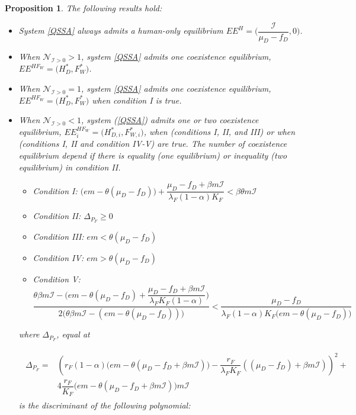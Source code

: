 \documentclass{article}
\newcommand{\lfw}{\lambda_{F}}
\newcommand{\lfw}{\lambda_{F}}
\newcommand{\cI}{\mathcal{I}}
\newtheorem{prop}{Proposition}
\begin{document}
\begin{prop}
The following results hold:
\begin{itemize}
\item System \eqref{QSSA} always admits a human-only equilibrium $EE^{H} = \Big(\dfrac{\cI}{\mu_D - f_D},0\Big)$.

\item When $\mathcal{N}_{\cI > 0}>1$, system \eqref{QSSA} admits one coexistence equilibrium, $EE^{HF_W} = \Big(H_D^*, F_W^* \Big)$. 

\item When $\mathcal{N}_{\cI > 0} = 1$, system \eqref{QSSA} admits one coexistence equilibrium, $EE^{HF_W} = \Big(H_D^*, F_W^* \Big)$ when condition I is true.

\item When $\mathcal{N}_{\cI > 0}<1$, system (\ref{QSSA}) admits one or two coexistence equilibrium, $EE_{i}^{HF_W} = \Big(H_{D,i}^*, F_{W,i}^* \Big)$, when (conditions I, II, and III) or when (conditions I, II and condition IV-V) are true. The number of coexistence equilibrium depend if there is equality (one equilibrium) or inequality (two equilibrium) in condition II.

\begin{itemize}
\item Condition I: $\Big(em - \theta(\mu_D-f_D) \Big) + \dfrac{\mu_D-f_D + \beta m \cI}{\lfw(1-\alpha) K_F } < \beta \theta m \cI$
\item Condition II: $\Delta_{P_F} \geq 0$
\item Condition III: $e m < \theta(\mu_D - f_D) $
\item Condition IV: $e m >\theta(\mu_D - f_D)$
\item Condition V: $\dfrac{  \theta \beta m \cI - \Big(em - \theta(\mu_D-f_D) + \dfrac{\mu_D-f_D + \beta m \cI}{\lfw K_F(1-\alpha) } \Big) }{2 \Big( \theta \beta m \cI - (em - \theta(\mu_D-f_D)) \Big)} < \dfrac{\mu_D - f_D}{\lfw (1-\alpha) K_F \Big(e m - \theta (\mu_D - f_D)  \Big) }$
\end{itemize}


where $\Delta_{P_F}$, equal at 

\begin{multline*}
\begin{array}{ll}
\Delta_{P_F}=&\left(r_{F}(1-\alpha)\Big(em-\theta(\mu_{D}-f_{D}+\beta m\mathcal{I})\Big)-\dfrac{r_{F}}{\lambda_{F}K_{F}}\left((\mu_{D}-f_{D})+\beta m\mathcal{I}\right)\right)^{2}+\\
&4\dfrac{r_{F}}{K_{F}}\Big(em-\theta(\mu_{D}-f_{D}+\beta m\mathcal{I})\Big)m\mathcal{I}
\end{array}
\end{multline*}
is the discriminant of the following polynomial:


\end{itemize}
\end{prop}
\end{document}
